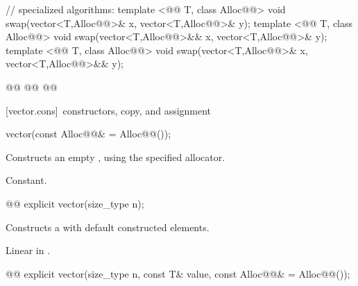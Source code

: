 \documentclass[american,twoside]{book}
\begin{document}
\begin{codeblock}
{  // specialized algorithms:
  template <@@ T, class Alloc@@>
    void swap(vector<T,Alloc@@>& x, vector<T,Alloc@@>& y);
  template <@@ T, class Alloc@@>
    void swap(vector<T,Alloc@@>&& x, vector<T,Alloc@@>& y);
  template <@@ T, class Alloc@@>
    void swap(vector<T,Alloc@@>& x, vector<T,Alloc@@>&& y);

  @@
    @@
      @@
}
\end{codeblock}%
%

[vector.cons]{\ constructors, copy, and assignment}

\begin{itemdecl}
vector(const Alloc@@& = Alloc@@());
\end{itemdecl}

\begin{itemdescr}
\pnum
\effects Constructs an empty , using the
specified allocator.

\pnum
\complexity Constant.
\end{itemdescr}

\begin{itemdecl}
@@ explicit vector(size_type n);
\end{itemdecl}

\begin{itemdescr}
\pnum
\effects Constructs a  with 
default constructed elements.

\pnum
{}

\pnum
\complexity Linear in .
\end{itemdescr}

\begin{itemdecl}
@@
explicit vector(size_type n, const T& value,
                const Alloc@@& = Alloc@@());
\end{itemdecl}
\end{document}
